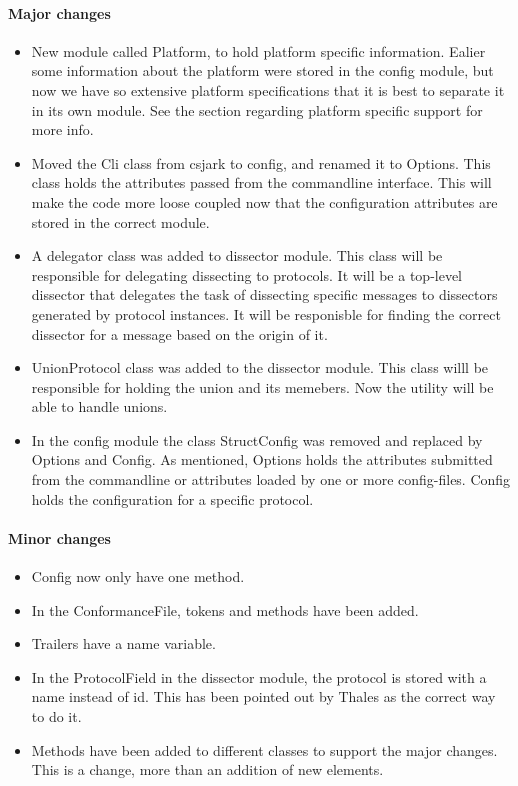 \paragraph{Major changes}
\begin{itemize}
\item New module called Platform, to hold platform specific information. Ealier some information about the platform were stored in the config module, but now we have so extensive platform specifications that it is best to separate it in its own module. See the section regarding platform specific support for more info.
\item Moved the Cli class from csjark to config, and renamed it to Options. This class holds the attributes passed from the commandline interface. This will make the code more loose coupled now that the configuration attributes are stored in the correct module. 
\item A delegator class was added to dissector module. This class will be responsible for delegating dissecting to protocols. It will be a top-level dissector that delegates the task of dissecting specific messages to dissectors generated by protocol instances. It will be responisble for finding the correct dissector for a message based on the origin of it.
\item UnionProtocol class was added to the dissector module. This class willl be responsible for holding the union and its memebers. Now the utility will be able to handle unions. 
\item In the config module the class StructConfig was removed and replaced by Options and Config. As mentioned, Options holds the attributes submitted from the commandline or attributes loaded by one or more config-files. Config holds the configuration for a specific protocol.

\end{itemize}

\paragraph{Minor changes}
\begin{itemize}
\item Config now only have one method.
\item In the ConformanceFile, tokens and methods have been added.
\item Trailers have a name variable.
\item In the ProtocolField in the dissector module, the protocol is stored with a name instead of id. This has been pointed out by Thales as the correct way to do it.
\item Methods have been added to different classes to support the major changes. This is a change, more than an addition of new elements. 
\end{itemize}

